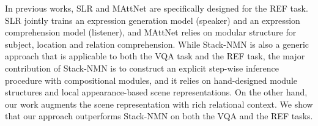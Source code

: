 \documentclass[10pt,twocolumn,letterpaper]{article}
\begin{document}
In previous works, SLR \cite{yu2017joint} and MAttNet \cite{yu2018mattnet} are specifically designed for the REF task. SLR jointly trains an expression generation model (speaker) and an expression comprehension model (listener), and MAttNet relies on modular structure for subject, location and relation comprehension. While Stack-NMN \cite{hu2018explainable} is also a generic approach that is applicable to both the VQA task and the REF task, the major contribution of Stack-NMN is to construct an explicit step-wise inference procedure with compositional modules, and it relies on hand-designed module structures and local appearance-based scene representations. On the other hand, our work augments the scene representation with rich relational context. We show that our approach outperforms Stack-NMN on both the VQA and the REF tasks.
\end{document}
